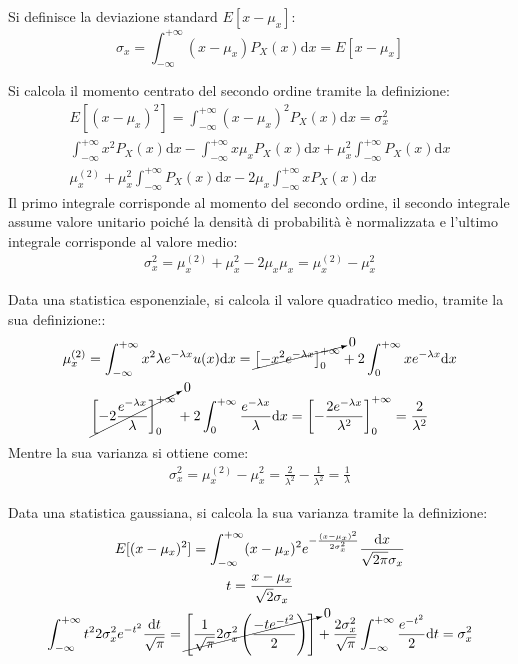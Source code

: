 \documentclass{article}
\newcommand{\df}{\mathrm{d}}
\numberwithin{equation}{subsection}
\begin{document}
Si definisce la deviazione standard $E[x-\mu_x]$:
\begin{equation}
    \sigma_x=\displaystyle\int_{-\infty}^{+\infty}(x-\mu_x)P_X(x)\df x=E[x-\mu_x]
\end{equation}


Si calcola il momento centrato del secondo ordine tramite la definizione:
\begin{gather*}
    E\left[(x-\mu_x)^2\right]=\displaystyle\int_{-\infty}^{+\infty}(x-\mu_x)^2P_X(x)\df x=\sigma_x^2\\
    \int_{-\infty}^{+\infty}x^2P_X(x)\df x-\int_{-\infty}^{+\infty}x\mu_xP_X(x)\df x+\mu_x^2\int_{-\infty}^{+\infty}P_X(x)\df x\\
    \mu_x^{(2)}+\mu_x^2\int_{-\infty}^{+\infty}P_X(x)\df x-2\mu_x\int_{-\infty}^{+\infty}xP_X(x)\df x
\end{gather*}
Il primo integrale corrisponde al momento del secondo ordine, il secondo integrale assume valore unitario poiché la densità di probabilità è normalizzata e l'ultimo 
integrale corrisponde al valore medio:
\begin{gather*}
    \sigma_x^2=\mu_x^{(2)}+\mu_x^2-2\mu_x\mu_x=\mu_x^{(2)}-\mu_x^2
\end{gather*}

Data una statistica esponenziale, si calcola il valore quadratico medio, tramite la sua definizione::
\begin{gather*}
    \mu_x^{(2)}=\displaystyle\int_{-\infty}^{+\infty}x^2\lambda e^{-\lambda x}u(x)\df x=\cancelto{0}{\left[-x^2e^{-\lambda x}\right]_0^{+\infty}}+2\int_{0}^{+\infty}xe^{-\lambda x}\df x\\
    \cancelto{0}{\left[-2\displaystyle\frac{e^{-\lambda x}}{\lambda}\right]_0^{+\infty}}+2\int_{0}^{+\infty}\frac{e^{-\lambda x}}{\lambda}\df x=\left[-\frac{2e^{-\lambda x}}{\lambda^2}\right]^{+\infty}_0=\frac{2}{\lambda^2}
\end{gather*}
Mentre la sua varianza si ottiene come:
\begin{gather*}
    \sigma_x^2=\mu_x^{(2)}-\mu_x^2=\displaystyle\frac{2}{\lambda^2}-\frac{1}{\lambda^2}=\frac{1}{\lambda}
\end{gather*}


Data una statistica gaussiana, si calcola la sua varianza tramite la definizione:
\begin{gather*}
    E[(x-\mu_x)^2]=\displaystyle\int_{-\infty}^{+\infty}(x-\mu_x)^2e^{-\frac{(x-\mu_x)^2}{2\sigma_x^2}}\frac{\df x}{\sqrt{2\pi}\sigma_x}\\
    t=\displaystyle\frac{x-\mu_x}{\sqrt{2}\sigma_x}\\
    \displaystyle\int_{-\infty}^{+\infty}t^22\sigma_x^2e^{-t^2}\frac{\df t}{\sqrt{\pi}}=\cancelto{0}{\left[\frac{1}{\sqrt{\pi}}2\sigma_x^2\left(\frac{-te^{-t^2}}{2}\right)\right]}+\frac{2\sigma_x^2}{\sqrt{\pi}}\int_{-\infty}^{+\infty}\frac{e^{-t^2}}{2}\df t=\sigma_x^2
\end{gather*}
\end{document}
